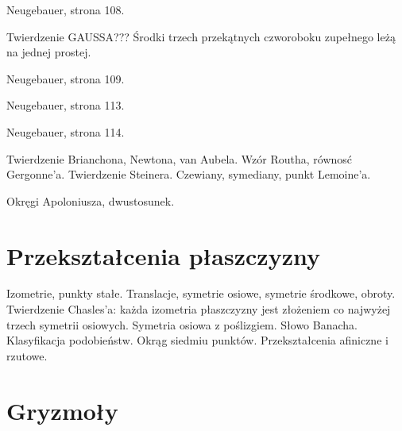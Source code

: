 \documentclass{parchment}
\begin{document}
\begin{proposition}
	Neugebauer, strona 108.
\end{proposition}

Twierdzenie GAUSSA???
Środki trzech przekątnych czworoboku zupełnego leżą na jednej prostej.

\begin{proposition}
	Neugebauer, strona 109.
\end{proposition}

\begin{proposition}
	Neugebauer, strona 113.
\end{proposition}

\begin{proposition}
	Neugebauer, strona 114.
\end{proposition}





Twierdzenie Brianchona, Newtona, van Aubela.
Wzór Routha, równosć Gergonne'a.
Twierdzenie Steinera.
Czewiany, symediany, punkt Lemoine'a.

Okręgi Apoloniusza, dwustosunek.


\chapter{Przekształcenia płaszczyzny}
Izometrie, punkty stałe.
Translacje, symetrie osiowe, symetrie środkowe, obroty.
Twierdzenie Chasles'a: każda izometria płaszczyzny jest złożeniem co najwyżej trzech symetrii osiowych.
Symetria osiowa z poślizgiem.
Słowo Banacha.
Klasyfikacja podobieństw.
Okrąg siedmiu punktów. %
Przekształcenia afiniczne i rzutowe.


\chapter{Gryzmoły}
\end{document}
